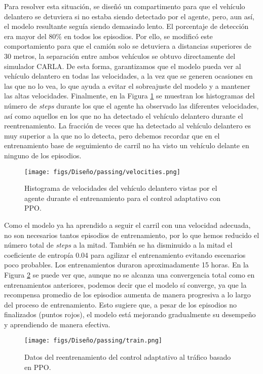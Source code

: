 Para resolver esta situación, se diseñó un compartimento para que el vehículo delantero se detuviera si no estaba siendo detectado por el agente, pero, aun así, el modelo resultante seguía siendo demasiado lento. El porcentaje de detección era mayor del 80\% en todos los episodios. Por ello, se modificó este comportamiento para que el camión solo se detuviera a distancias superiores de 30 metros, la separación entre ambos vehículos se obtuvo directamente del simulador CARLA. De esta forma, garantizamos que el modelo pueda ver al vehículo delantero en todas las velocidades, a la vez que se generen ocasiones en las que no lo vea, lo que ayuda a evitar el sobreajuste del modelo y a mantener las altas velocidades. Finalmente, en la Figura \ref{fig:velocities} se muestran los histogramas del número de \textit{steps} durante los que el agente ha observado las diferentes velocidades, así como aquellos en los que no ha detectado el vehículo delantero durante el reentrenamiento. La fracción de veces que ha detectado al vehículo delantero es muy superior a la que no lo detecta, pero debemos recordar que en el entrenamiento base de seguimiento de carril no ha visto un vehículo delante en ninguno de los episodios.

\begin{figure}[ht]
\centering
\texttt{[image: figs/Diseño/passing/velocities.png]}
\caption{Histograma de velocidades del vehículo delantero vistas por el agente durante el entrenamiento para el control adaptativo con \ac{PPO}.}
\label{fig:velocities}
\end{figure}

Como el modelo ya ha aprendido a seguir el carril con una velocidad adecuada, no son necesarios tantos episodios de entrenamiento, por lo que hemos reducido el número total de \textit{steps} a la mitad. También se ha disminuido a la mitad el coeficiente de entropía 0.04 para agilizar el entrenamiento evitando escenarios poco probables. Los entrenamientos duraron aproximadamente 15 horas. En la Figura \ref{fig:train_traffic} se puede ver que, aunque no se alcanza una convergencia total como en entrenamientos anteriores, podemos decir que el modelo sí converge, ya que la recompensa promedio de los episodios aumenta de manera progresiva a lo largo del proceso de entrenamiento. Esto sugiere que, a pesar de los episodios no finalizados (puntos rojos), el modelo está mejorando gradualmente su desempeño y aprendiendo de manera efectiva.
\begin{figure}[ht]
\centering
\texttt{[image: figs/Diseño/passing/train.png]}
\caption{Datos del reentrenamiento del control adaptativo al tráfico basado en \ac{PPO}.}
\label{fig:train_traffic}
\end{figure}

